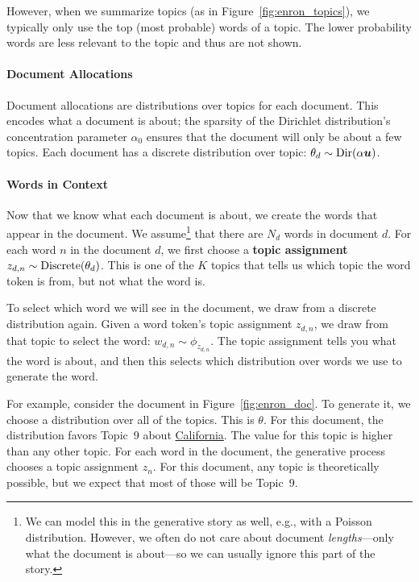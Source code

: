However, when we summarize topics (as in
Figure~\ref{fig:enron_topics}), we typically only use the top (most probable) words of
a topic.  The lower probability words are less relevant to the topic
and thus are not shown.

\paragraph{Document Allocations}

Document allocations are distributions over topics for each document.  This
encodes what a document is about; the sparsity of the Dirichlet distribution's
concentration parameter $\alpha_0$ ensures that the document will only be about a
few topics.  Each document has a discrete distribution over topic: $\theta_d \sim
\mbox{Dir}(\alpha {\bm u})$.

\paragraph{Words in Context}

Now that we know what each document is about, we create the
words that appear in the document.  We assume\footnote{We can model
  this in the generative story as well, e.g., with a Poisson distribution.
  However, we often do not care about document \emph{lengths}---only what the
  document is about---so we can usually ignore this part of the story.} that
there are $N_d$ words in document $d$.  For each word $n$ in the
document $d$, we first choose a {\bf topic assignment} $z_{d,n} \sim
\mbox{Discrete}( \theta_d)$.  This is one of the $K$ topics that tells us which topic the
word token is from, but not what the word is.

To select which word we will see in the document, we draw from a discrete
distribution again.  Given a word token's topic assignment $z_{d,n}$, we draw from that
topic to select the word: $w_{d,n} \sim \phi_{z_{d,n}}$.  The topic assignment
tells you what the word is about, and then this selects which distribution over
words we use to generate the word.  %

For example, consider the document in Figure~\ref{fig:enron_doc}.  To
generate it, we choose a distribution over all of the topics.  This is
$\theta$.  For this document, the distribution favors Topic~9 about
\underline{California}.  The value for this topic is higher than any other topic.  For
each word in the document, the generative process chooses a topic
assignment $z_n$.  For this document, any topic is theoretically possible, but we expect that most of those will be Topic~9.

